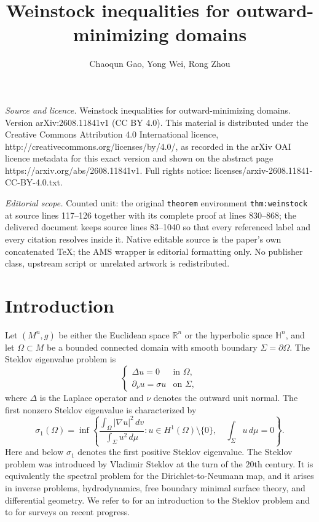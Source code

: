 \documentclass[10pt,a4paper]{amsart}
\numberwithin{equation}{section}
\newcommand{\R}{\mathbb R}
\newcommand{\HH}{\mathbb H}
\begin{document}
\title[Weinstock inequalities for outward-minimizing domains]{Weinstock inequalities for outward-minimizing domains}
\author{Chaoqun Gao, Yong Wei, Rong Zhou}
\date{}
\maketitle
\noindent\emph{Source and licence.} Weinstock inequalities for outward-minimizing domains. Version arXiv:2608.11841v1 (CC BY 4.0). This material is distributed under the Creative Commons Attribution 4.0 International licence, http://creativecommons.org/licenses/by/4.0/, as recorded in the arXiv OAI licence metadata for this exact version and shown on the abstract page https://arxiv.org/abs/2608.11841v1. Full rights notice: licenses/arxiv-2608.11841-CC-BY-4.0.txt.\par\smallskip
\noindent\textit{Editorial scope.} Counted unit: the original \texttt{theorem} environment \texttt{thm:weinstock} at source lines 117--126 together with its complete proof at lines 830--868; the delivered document keeps source lines 83--1040 so that every referenced label and every citation resolves inside it. Native editable source is the paper's own concatenated TeX; the AMS wrapper is editorial formatting only. No publisher class, upstream script or unrelated artwork is redistributed.
\section{Introduction}

Let $(M^n,g)$ be either the Euclidean space $\R^n$ or the hyperbolic space $\HH^n$, and let $\Omega\subset M$ be a bounded connected domain with smooth boundary $\Sigma=\partial\Omega$.  The Steklov eigenvalue problem is
\begin{equation*}
\begin{cases}
    \Delta u=0 & \text{in }\Omega,\\
    \partial_\nu u=\sigma u & \text{on }\Sigma,
\end{cases}
\end{equation*}
where $\Delta$ is the Laplace operator and $\nu$ denotes the outward unit normal.  The first nonzero Steklov eigenvalue is characterized by
\begin{equation}\label{eq:steklov-variational}
    \sigma_1(\Omega)
    =\inf\left\{
        \frac{\int_\Omega |\nabla u|^2\,dv}{\int_{\Sigma} u^2\,d\mu}:
        u\in H^1(\Omega)\setminus\{0\},\quad
        \int_{\Sigma}u\,d\mu=0
      \right\}.
\end{equation}
Here and below $\sigma_1$ denotes the first positive Steklov eigenvalue.  The Steklov problem was introduced by Vladimir Steklov at the turn of the $20$th century.  It is equivalently the spectral problem for the Dirichlet-to-Neumann map, and it arises in inverse problems, hydrodynamics, free boundary minimal surface theory, and differential geometry.  We refer to \cite[Chapter~7]{LMP2023} for an introduction to the Steklov problem and to \cite{CGGS24,Fra20,GP2017} for surveys on recent progress.
\end{document}
